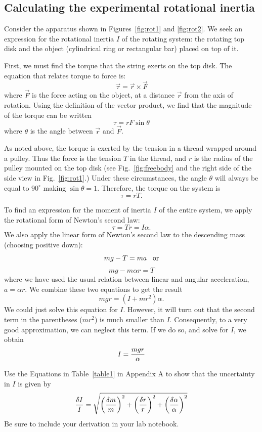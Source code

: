 \subsection*{Calculating the experimental rotational inertia}

Consider the apparatus shown in Figures~\ref{fig:rot1} and
\ref{fig:rot2}.  We seek an expression for the rotational inertia
$I$ of the rotating system:  the rotating top disk and the object
(cylindrical ring or rectangular bar) placed on top of it.

First, we must find the torque that the string exerts on the top
disk.  The equation that relates torque to force is:
\[
\vec{\tau} = \vec{r} \times \vec{F}
\]
where $\vec{F}$ is the force acting on the object, at a distance
$\vec{r}$ from
the axis of rotation.  Using the definition of the vector
product, we find that the magnitude of the torque can be written
\[
\tau = rF \sin\theta
\]
where $\theta$ is the angle between $\vec{r}$ and $\vec{F}$.

As noted above, the torque is exerted by the
tension in a thread wrapped around a pulley.
Thus the force is the tension $T$ in the thread, and $r$ is the radius
of the pulley mounted on the top disk (see
Fig.~\ref{fig:freebody} and the right side of the side
view in  Fig.~\ref{fig:rot1}.)  Under these circumstances, the angle
$\theta$ will always be equal to $90^{\circ}$ making $\sin\theta = 1$.
Therefore, the torque on the system is
\[
\tau = rT.
\]

To find an expression for the moment of inertia $I$ of the entire
system, we apply the rotational form of Newton's second law:
\[
\tau = Tr = I \alpha.
\]
We also apply the linear form of Newton's second law to the
descending mass (choosing positive down):
\[
mg -T = ma  \;\;\; {\rm or}
\]
\[
mg -m \alpha r = T
\]
where we have used the usual relation between linear and angular acceleration,
$a=\alpha r$.  We combine these two equations to get the result
\[
mgr = (I + mr^{2}) \alpha  .
\]
We could just solve this equation for $I$.  However, it will turn
out that the second term in the parentheses ($ mr^{2}$) is much smaller
than $I$. Consequently, to a very good approximation, we can neglect
this term.  If we do so, and solve for $I$, we obtain
\begin{equation}
I = {mgr \over \alpha}
\label{eq:rotfree}
\end{equation}


Use the Equations in Table~\ref{table1} in Appendix A to show that
the uncertainty in $I$ is given by
\[
{\delta I \over I} = \sqrt{
                           \left( {\delta m \over m} \right)^2  +
                           \left( {\delta r \over r} \right)^2  +
                       \left( {{\delta \alpha} \over \alpha} \right)^2
                     }
\]
Be sure to include your derivation in your lab notebook.


